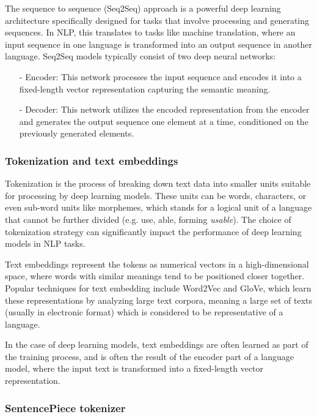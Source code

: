 \documentclass[12pt]{article}
\begin{document}
The sequence to sequence (Seq2Seq) approach is a powerful deep learning architecture specifically designed for tasks that involve processing and generating sequences. In NLP, this translates to tasks like machine translation, where an input sequence in one language is transformed into an output sequence in another language. Seq2Seq models typically consist of two deep neural networks:
\begin{enumerate}
    \item[-] Encoder: This network processes the input sequence and encodes it into a fixed-length vector representation capturing the semantic meaning.
    \item[-] Decoder: This network utilizes the encoded representation from the encoder and generates the output sequence one element at a time, conditioned on the previously generated elements.
\end{enumerate}

\subsubsection{Tokenization and text embeddings}

Tokenization is the process of breaking down text data into smaller units suitable for processing by deep learning models. These units can be words, characters, or even sub-word units like morphemes, which stands for a logical unit of a language that cannot be further divided (e.g. use, able, forming \textit{usable}). The choice of tokenization strategy can significantly impact the performance of deep learning models in NLP tasks.

Text embeddings represent the tokens as numerical vectors in a high-dimensional space, where words with similar meanings tend to be positioned closer together. Popular techniques for text embedding include Word2Vec and GloVe, which learn these representations by analyzing large text corpora, meaning a large set of texts (usually in electronic format) which is considered to be representative of a language.

In the case of deep learning models, text embeddings are often learned as part of the training process, and is often the result of the encoder part of a language model, where the input text is transformed into a fixed-length vector representation.


\subsubsection{SentencePiece tokenizer}
\end{document}

